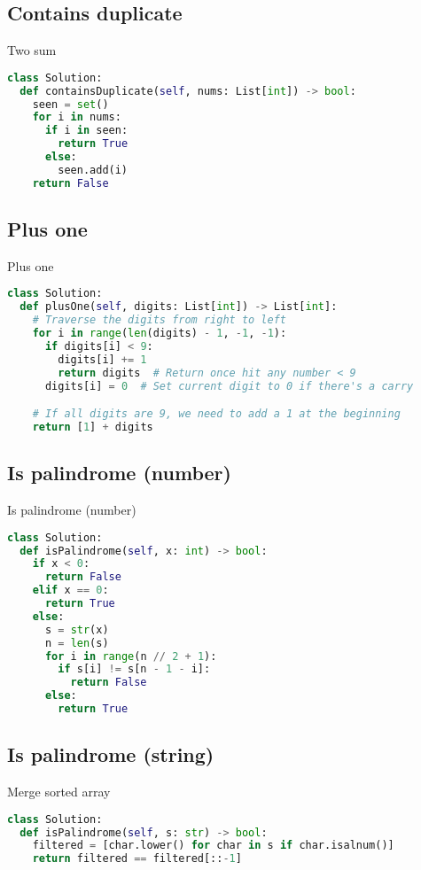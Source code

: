 \documentclass[a4paper,12pt]{article}
\begin{document}
\begin{multicols}{2}
\subsection{Contains duplicate}

\begin{mycode}[label={lst:Two sum}]{Two sum}
\begin{lstlisting}[language=Python]
class Solution:
  def containsDuplicate(self, nums: List[int]) -> bool:
    seen = set()
    for i in nums:
      if i in seen:
        return True
      else:
        seen.add(i)
    return False
\end{lstlisting}
\end{mycode}

\subsection{Plus one}

\begin{mycode}[label={lst:plus-one}]{Plus one}
\begin{lstlisting}[language=Python]
class Solution:
  def plusOne(self, digits: List[int]) -> List[int]:
    # Traverse the digits from right to left
    for i in range(len(digits) - 1, -1, -1):
      if digits[i] < 9:
        digits[i] += 1
        return digits  # Return once hit any number < 9
      digits[i] = 0  # Set current digit to 0 if there's a carry

    # If all digits are 9, we need to add a 1 at the beginning
    return [1] + digits
\end{lstlisting}
\end{mycode}

\subsection{Is palindrome (number)}

\begin{mycode}[label={lst:is-palindrome}]{Is palindrome (number)}
\begin{lstlisting}[language=Python]
class Solution:
  def isPalindrome(self, x: int) -> bool:
    if x < 0:
      return False
    elif x == 0:
      return True
    else:
      s = str(x)
      n = len(s)
      for i in range(n // 2 + 1):
        if s[i] != s[n - 1 - i]:
          return False
      else:
        return True
\end{lstlisting}
\end{mycode}

\subsection{Is palindrome (string)}
\begin{mycode}[label={lst:merge-sorted-array}]{Merge sorted array}
\begin{lstlisting}[language=Python]
class Solution:
  def isPalindrome(self, s: str) -> bool:
    filtered = [char.lower() for char in s if char.isalnum()]
    return filtered == filtered[::-1]
\end{lstlisting}
\end{mycode}


\end{multicols}
\end{document}
